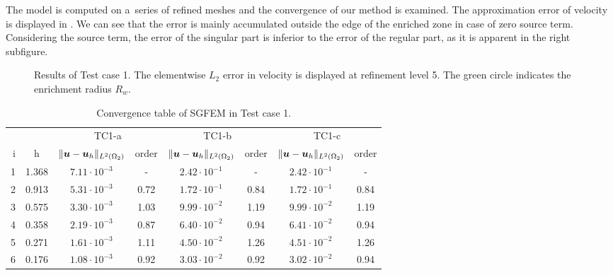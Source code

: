 The model is computed on a~series of refined meshes and the convergence of our method is examined.
The approximation error of velocity is displayed in . We can see that 
the error is mainly accumulated outside the edge of the enriched zone in case of zero source term.
Considering the source term, the error of the singular part is inferior to the error of the regular part, as it is apparent
in the right subfigure.
%
\begin{figure}[!htb]
    \centering
    \caption[Error distribution in Test case 1.]
    {Results of Test case 1. The elementwise $L_2$ error in velocity is displayed at refinement level 5.
    The green circle indicates the enrichment radius $R_w$.}
    \label{fig:mh_tc1_error}
\end{figure}
%
%
%
\begin{table}[!htb]
\begin{center}
\bgroup
\def\arraystretch{1.2}
\setlength\tabcolsep{5pt}
\begin{tabular}{rc|cc|cc|cc}
\toprule
\multicolumn{2}{c|}{} & \multicolumn{2}{c|}{ TC1-a} & \multicolumn{2}{c|}{TC1-b} & \multicolumn{2}{c}{TC1-c}\\ [3pt] %
i & h & $\|\mathbf{\boldsymbol{u}}-\mathbf{\boldsymbol{u}}_h\|_{L^2(\Omega_2)}$ & order & $\|\mathbf{\boldsymbol{u}}-\mathbf{\boldsymbol{u}}_h\|_{L^2(\Omega_2)}$
    & order & $\|\mathbf{\boldsymbol{u}}-\mathbf{\boldsymbol{u}}_h\|_{L^2(\Omega_2)}$ & order \\ [3pt] \midrule
1 & 1.368 &  $7.11\cdot10^{-3}$  &  -   &  $2.42\cdot10^{-1}$  &  -   &  $2.42\cdot10^{-1}$ &   -   \\
2 & 0.913 &  $5.31\cdot10^{-3}$  & 0.72 &  $1.72\cdot10^{-1}$  & 0.84 &  $1.72\cdot10^{-1}$ &  0.84 \\
3 & 0.575 &  $3.30\cdot10^{-3}$  & 1.03 &  $9.99\cdot10^{-2}$  & 1.19 &  $9.99\cdot10^{-2}$ &  1.19 \\
4 & 0.358 &  $2.19\cdot10^{-3}$  & 0.87 &  $6.40\cdot10^{-2}$  & 0.94 &  $6.41\cdot10^{-2}$ &  0.94 \\
5 & 0.271 &  $1.61\cdot10^{-3}$  & 1.11 &  $4.50\cdot10^{-2}$  & 1.26 &  $4.51\cdot10^{-2}$ &  1.26 \\
6 & 0.176 &  $1.08\cdot10^{-3}$  & 0.92 &  $3.03\cdot10^{-2}$  & 0.92 &  $3.02\cdot10^{-2}$ &  0.94 \\
\bottomrule
\end{tabular}
\caption{Convergence table of SGFEM in Test case 1.}
\label{tab:mh_tc1_convergence}
\egroup
\end{center}
\end{table}

